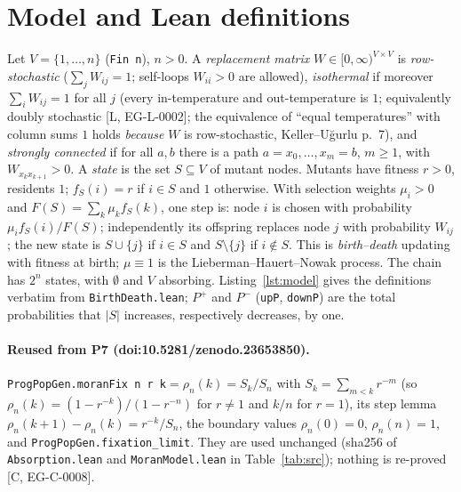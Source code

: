 \documentclass[11pt]{article}
\newcommand{\tier}[1]{\textsf{[#1]}}
\newcommand{\lean}[1]{\texttt{#1}}
\newcommand{\rhoF}{\rho_n}
\begin{document}
\section{Model and Lean definitions}\label{sec:model}
Let $V=\{1,\dots,n\}$ (\lean{Fin n}), $n>0$. A \emph{replacement matrix} $W\in[0,\infty)^{V\times V}$ is \emph{row-stochastic} ($\sum_jW_{ij}=1$; self-loops $W_{ii}>0$ are allowed),
\emph{isothermal} if moreover $\sum_iW_{ij}=1$ for all $j$ (every in-temperature and out-temperature is $1$; equivalently doubly stochastic \tier{L, EG-L-0002}; the equivalence of ``equal temperatures'' with column sums $1$ holds \emph{because} $W$ is row-stochastic, Keller--U\u{g}urlu p.~7), and \emph{strongly connected}
if for all $a,b$ there is a path $a=x_0,\dots,x_m=b$, $m\ge1$, with $W_{x_kx_{k+1}}>0$. A \emph{state} is the set $S\subseteq V$ of mutant nodes. Mutants have fitness $r>0$, residents $1$; $f_S(i)=r$ if $i\in S$ and $1$ otherwise.
With selection weights $\mu_i>0$ and $F(S)=\sum_k\mu_kf_S(k)$, one step is: node $i$ is chosen with probability $\mu_if_S(i)/F(S)$; independently its offspring replaces node $j$ with probability $W_{ij}$; the new state is
$S\cup\{j\}$ if $i\in S$ and $S\setminus\{j\}$ if $i\notin S$. This is \emph{birth--death} updating with fitness at birth; $\mu\equiv1$ is the Lieberman--Hauert--Nowak process.
The chain has $2^n$ states, with $\emptyset$ and $V$ absorbing. Listing~\ref{lst:model} gives the definitions verbatim from \texttt{BirthDeath.lean}; $P^{+}$ and $P^{-}$ (\lean{upP}, \lean{downP}) are the total probabilities that $|S|$ increases, respectively decreases, by one.



\paragraph{Reused from P7 (doi:10.5281/zenodo.23653850).} \lean{ProgPopGen.moranFix n r k}$=\rhoF(k)=S_k/S_n$ with $S_k=\sum_{m<k}r^{-m}$ (so $\rhoF(k)=(1-r^{-k})/(1-r^{-n})$ for $r\neq1$ and $k/n$ for $r=1$), its step lemma $\rhoF(k+1)-\rhoF(k)=r^{-k}/S_n$,
the boundary values $\rhoF(0)=0$, $\rhoF(n)=1$, and \lean{ProgPopGen.fixation\_limit}. They are used unchanged (sha256 of \texttt{Absorption.lean} and \texttt{MoranModel.lean} in Table~\ref{tab:src}); nothing is re-proved \tier{C, EG-C-0008}.
\end{document}
